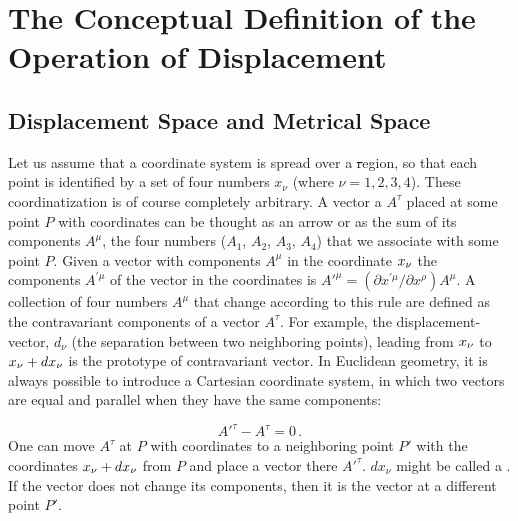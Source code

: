 \documentclass[submitted]{article}
\begin{document}
\section{The Conceptual Definition of the Operation of Displacement}

\subsection{Displacement Space and Metrical Space}

Let us assume that a coordinate system is spread over a \st region, so that each point is identified by a set of four numbers $x_\nu$ (where $\nu=1,2,3,4$). These coordinatization is of course completely arbitrary. A vector a $A^\tau$ placed at some point $P$ with coordinates \xn can be thought as an arrow or as the sum of its components $A^\mu$, the four numbers ($A_1$, $A_2$, $A_3$, $A_4$) that we associate with some point $P$. Given a vector with components $A^{\mu}$ in the coordinate $x_{\nu}$ the components $A^{\prime \mu}$ of the vector in the coordinates \xnpr is $A'^{\mu}=\left(\partial x^{\prime \mu} / \partial x^{\rho}\right) A^{\mu}$. A collection of four numbers $A^\mu$ that change according to this rule are defined as the contravariant components of a vector $A^\tau$. For example, the displacement-vector, $d_\nu$ (the separation between two neighboring points), leading from $x_{\nu}$ to $x_{\nu} + dx_{\nu}$ is the prototype of contravariant vector. In Euclidean geometry, it is always possible to introduce a Cartesian coordinate system, in which two vectors are equal and parallel when they have the same components:

\begin{equation}\label{eq:samness}
A'^\tau-A^\tau=0\,.
\end{equation}
%
One can move $A^\tau$ at $P$ with coordinates \xn to a neighboring point $P'$ with the coordinates $x_{\nu}+dx_\nu$ from $P$ and place a vector there $A'^{\tau}$. $dx_\nu$ might be called a . If the vector does not change its components, then it is the  vector at a different point $P'$. 
\end{document}

